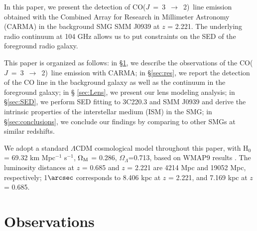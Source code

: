 \documentclass[twocolumn,apj,numberedappendix]{emulateapj}
\newcommand{\CO}{\mbox{CO($J$ = 3 $\rightarrow$ 2) }}
\newcommand{\pmOne}{$^{-1}$}
\begin{document}
In this paper, we present the detection of \CO line emission obtained with the Combined
Array for Research in Millimeter Astronomy (CARMA) in the background SMG
SMM J0939 at $z$ = 2.221. The underlying radio continuum at 104 GHz allows us to put constraints on the SED of the 
foreground radio galaxy. 

This paper is organized as follows: in \S \ref{sec:obs}, we describe the
observations of the \CO line emission with CARMA; in \S \ref{sec:res}, we report the
detection of the CO line in the background galaxy as well as the continuum in the foreground galaxy; in \S
\ref{sec:Lens}, we present our lens modeling analysis; in \S \ref{sec:SED}, we perform SED fitting to 3C220.3
and SMM J0939 and derive the intrinsic properties of the interstellar medium (ISM) in the SMG; in \S \ref{sec:conclusions}, we
conclude our findings by comparing to other SMGs at similar redshifts.

We adopt a standard $\Lambda$CDM cosmological model throughout this paper, with H$_0$= 69.32 km Mpc\pmOne
s\pmOne, $\Omega_{\rm M}$ = 0.286, $\Omega_\Lambda$=0.713, based on WMAP9 results \citep{Hinshaw13a}.
The luminosity distances at $z$ = 0.685 and $z$ = 2.221 are 4214 Mpc and 19052 Mpc, respectively; 1$\arcsec$
corresponds to 8.406 kpc at $z$ = 2.221, and 7.169 kpc at $z$ = 0.685.

\section{Observations}\label{sec:obs}
\end{document}
